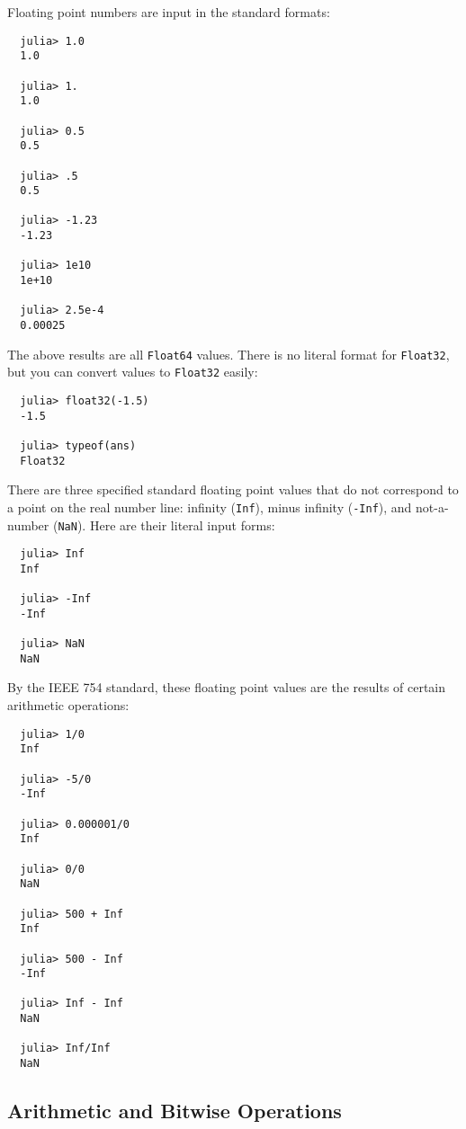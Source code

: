 \documentclass{article}
\begin{document}
Floating point numbers are input in the standard formats:
\begin{verbatim}
  julia> 1.0
  1.0

  julia> 1.
  1.0

  julia> 0.5
  0.5

  julia> .5
  0.5

  julia> -1.23
  -1.23

  julia> 1e10
  1e+10

  julia> 2.5e-4
  0.00025
\end{verbatim}
The above results are all \verb|Float64| values. There is no literal format for \verb|Float32|, but you can convert values to \verb|Float32| easily:
\begin{verbatim}
  julia> float32(-1.5)
  -1.5

  julia> typeof(ans)
  Float32
\end{verbatim}
There are three specified standard floating point values that do not correspond to a point on the real number line: infinity (\verb|Inf|), minus infinity (\verb|-Inf|), and not-a-number (\verb|NaN|).
Here are their literal input forms:
\begin{verbatim}
  julia> Inf
  Inf

  julia> -Inf
  -Inf

  julia> NaN
  NaN
\end{verbatim}
By the IEEE 754 standard, these floating point values are the results of certain arithmetic operations:
\begin{verbatim}
  julia> 1/0
  Inf

  julia> -5/0
  -Inf

  julia> 0.000001/0
  Inf

  julia> 0/0
  NaN

  julia> 500 + Inf
  Inf

  julia> 500 - Inf
  -Inf

  julia> Inf - Inf
  NaN

  julia> Inf/Inf
  NaN
\end{verbatim}

\subsection{Arithmetic and Bitwise Operations}
\end{document}
